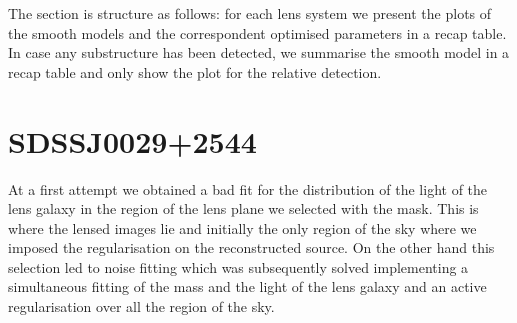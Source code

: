 \documentclass[a4paper,fleqn,usenatbib]{mnras}
\begin{document}
The section is structure as follows: for each lens system we present the plots of the smooth models and the correspondent optimised parameters in a recap table. In case any substructure has been detected, we summarise the smooth model in a recap table and only show the plot for the relative detection.

\onecolumn
\section{SDSSJ0029+2544}
At a first attempt we obtained a bad fit for the distribution of the light of the lens galaxy in the region of the lens plane we selected with the mask. This is where the lensed images lie and initially the only region of the sky where we imposed the regularisation on the reconstructed source. On the other hand this selection led to noise fitting which was subsequently solved implementing a simultaneous fitting of the mass and the light of the lens galaxy and an active regularisation over all the region of the sky.

\begin{table}
\end{table}
\end{document}
